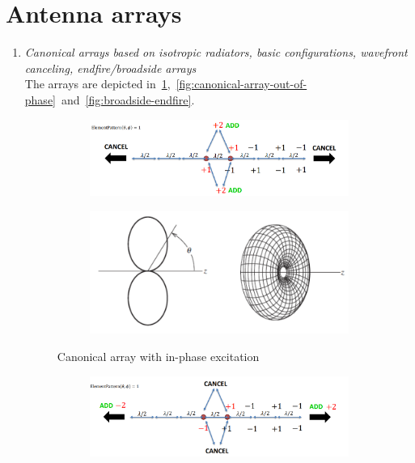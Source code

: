 \documentclass[11pt,a4paper]{article}
\begin{document}
\section{Antenna arrays}
\begin{enumerate}
    \item \emph{Canonical arrays based on isotropic radiators, basic configurations, wavefront canceling, endfire/broadside arrays}\\
    The arrays are depicted in~\ref{fig:canonical-array-in-phase},~\ref{fig:canonical-array-out-of-phase}~and~\ref{fig:broadside-endfire}.
    \begin{figure}[!ht]
        \centering
        \begin{subfigure}{.45\textwidth}
            \centering
            \includegraphics[width=\textwidth]{src/canonical-array-in-phase.png}
        \end{subfigure}\hfill
        \begin{subfigure}{.45\textwidth}
            \centering
            \includegraphics[width=\textwidth]{src/canonical-array-in-phase-pattern.png}
        \end{subfigure}
        \caption{\label{fig:canonical-array-in-phase}Canonical array with in-phase excitation}
    \end{figure}
    \begin{figure}[!ht]
        \centering
        \begin{subfigure}{.45\textwidth}
            \centering
            \includegraphics[width=\textwidth]{src/canonical-array-out-of-phase.png}

\end{subfigure}
\end{figure}
\end{enumerate}
\end{document}
